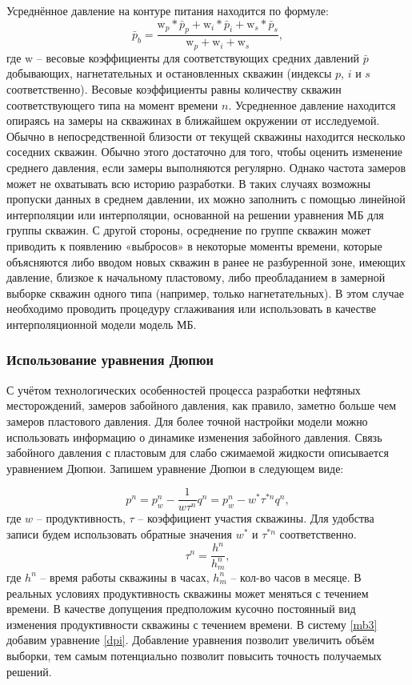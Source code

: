 \documentclass[14pt]{article}
\begin{document}
Усреднённое давление на контуре питания находится по формуле:
\begin{equation}\label{mpc}
	\bar{p}_b = \frac{\mathrm{w}_p*\bar{p}_p + \mathrm{w}_i*\bar{p}_i + \mathrm{w}_s*\bar{p}_s}{\mathrm{w}_p + \mathrm{w}_i + \mathrm{w}_s},
\end{equation}
где $\mathrm{w}$ -- весовые коэффициенты для соответствующих средних давлений $\bar{p}$ добывающих, нагнетательных и остановленных скважин (индексы $p$, $i$ и $s$ соответственно). Весовые коэффициенты равны количеству скважин соответствующего типа на момент времени $n$. Усредненное давление находится опираясь на замеры на скважинах в ближайшем окружении от исследуемой.
Обычно в непосредственной близости от текущей скважины находится несколько соседних скважин. Обычно этого достаточно для того, чтобы оценить изменение среднего давления, если замеры выполняются регулярно. Однако частота замеров может не охватывать всю историю разработки. В таких случаях возможны пропуски данных в среднем давлении, их можно заполнить с помощью линейной интерполяции или интерполяции, основанной на решении уравнения МБ для группы скважин. С другой стороны, осреднение по группе скважин может приводить к появлению «выбросов» в некоторые моменты времени, которые объясняются либо вводом новых скважин в ранее не разбуренной зоне, имеющих давление, близкое к начальному пластовому, либо преобладанием в замерной выборке скважин одного типа (например, только нагнетательных). В этом случае необходимо проводить процедуру сглаживания или использовать в качестве интерполяционной модели модель МБ. 

\subsubsection{Использование уравнения Дюпюи}
С учётом технологических особенностей процесса разработки нефтяных месторождений, замеров забойного давления, как правило, заметно больше чем замеров пластового давления. Для более точной настройки модели можно использовать информацию о динамике изменения забойного давления. Связь забойного давления с пластовым для слабо сжимаемой жидкости описывается уравнением Дюпюи. Запишем уравнение Дюпюи в следующем виде:

\begin{equation}\label{dpi}
	p^n = p_w^n - \frac{1}{w \tau^n}q^n = p_w^n - w^* \tau^{*n} q^n, 
\end{equation}
где $w$ -- продуктивность, $\tau$ -- коэффициент участия скважины. Для удобства записи будем использовать обратные значения $w^*$ и $\tau^{*n}$ соответственно.
\begin{equation*}
	\tau^n = \frac{h^n}{h^n_m},
\end{equation*}
где $h^n$ -- время работы скважины в часах, $h^n_m$ -- кол-во часов в месяце.
В реальных условиях продуктивность скважины может меняться с течением времени. В качестве допущения предположим кусочно постоянный вид изменения продуктивности скважины с течением времени. В систему \ref{mb3} добавим уравнение \ref{dpi}. Добавление уравнения позволит увеличить объём выборки, тем самым потенциально позволит повысить точность получаемых решений.
\end{document}
